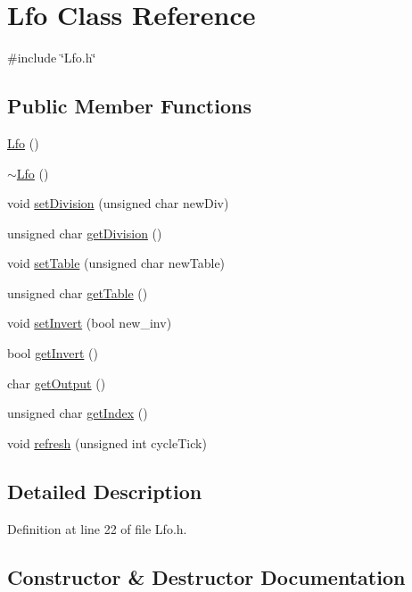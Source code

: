 \hypertarget{class_lfo}{}\section{Lfo Class Reference}
\label{class_lfo}


{\ttfamily \#include \char`\"{}Lfo.\+h\char`\"{}}

\subsection*{Public Member Functions}
\begin{DoxyCompactItemize}
\item 
\hyperlink{class_lfo_aa1546b11ce8b14895de9200209006332}{Lfo} ()
\item 
\hyperlink{class_lfo_a95e36a9f84091073c742983741247367}{$\sim$\+Lfo} ()
\item 
void \hyperlink{class_lfo_a525733f0ed750902b8577b08c0c55023}{set\+Division} (unsigned char new\+Div)
\item 
unsigned char \hyperlink{class_lfo_afba7d39f952c4b02d101f8e46e9cc20d}{get\+Division} ()
\item 
void \hyperlink{class_lfo_a6c0c12b49e8b69c4e839eed57130d2ad}{set\+Table} (unsigned char new\+Table)
\item 
unsigned char \hyperlink{class_lfo_a9f017ebd3b628e4afbca7371cdebc61c}{get\+Table} ()
\item 
void \hyperlink{class_lfo_ae4f5f170252aabf8d6e44556e587779e}{set\+Invert} (bool new\+\_\+inv)
\item 
bool \hyperlink{class_lfo_af55fdb8ee75c2da369056a1b0720fe41}{get\+Invert} ()
\item 
char \hyperlink{class_lfo_a0363f6a07cb699caf291b4954a40f152}{get\+Output} ()
\item 
unsigned char \hyperlink{class_lfo_a007a56fbcb5a5cf639dc397d35d6392f}{get\+Index} ()
\item 
void \hyperlink{class_lfo_a42c8d118df4ecbf3057319b56203133d}{refresh} (unsigned int cycle\+Tick)
\end{DoxyCompactItemize}


\subsection{Detailed Description}


Definition at line 22 of file Lfo.\+h.



\subsection{Constructor \& Destructor Documentation}
\mbox{\label{class_lfo_aa1546b11ce8b14895de9200209006332}} 
